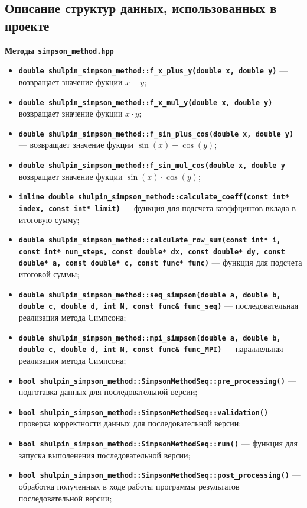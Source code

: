 \documentclass[12pt,a4paper]{article}
\begin{document}
\subsection{Описание структур данных, использованных в проекте}
\textbf{Методы \texttt{simpson\_method.hpp}}
\begin{itemize}
    \item \textbf{\texttt{double shulpin\_simpson\_method::f\_x\_plus\_y(double x, double y)}} --- возвращает значение фукции $x + y$;
    \item \textbf{\texttt{double shulpin\_simpson\_method::f\_x\_mul\_y(double x, double y)}} --- возвращает значение фукции $x \cdot y$;
    \item \textbf{\texttt{double shulpin\_simpson\_method::f\_sin\_plus\_cos(double x, double y)}} --- возвращает значение фукции $\sin(x) + \cos(y)$;
    \item \textbf{\texttt{double shulpin\_simpson\_method::f\_sin\_mul\_cos(double x, double y}} --- возвращает значение фукции $\sin(x) \cdot \cos(y)$;
    \item \textbf{\texttt{inline double shulpin\_simpson\_method::calculate\_coeff(const int* index, const int* limit)}} --- функция для подсчета коэффцинтов вклада в итоговую сумму;
    \item \textbf{\texttt{double shulpin\_simpson\_method::calculate\_row\_sum(const int* i, const int* num\_steps, const double* dx, const double* dy, const double* a, const double* c, const func* func)}} --- функция для подсчета итоговой суммы;
    \item \textbf{\texttt{double shulpin\_simpson\_method::seq\_simpson(double a, double b, double c, double d, int N, const func\& func\_seq)}} --- последовательная реализация метода Симпсона;
    \item \textbf{\texttt{double shulpin\_simpson\_method::mpi\_simpson(double a, double b, double c, double d, int N, const func\& func\_MPI)}} --- параллельная реализация метода Симпсона;
    \item \textbf{\texttt{bool shulpin\_simpson\_method::SimpsonMethodSeq::pre\_processing()}} --- подготавка данных для последовательной версии;
    \item \textbf{\texttt{bool shulpin\_simpson\_method::SimpsonMethodSeq::validation()}} --- проверка корректности данных для последовательной версии;
    \item \textbf{\texttt{bool shulpin\_simpson\_method::SimpsonMethodSeq::run()}} --- функция для запуска выполенения последовательной версии;
    \item \textbf{\texttt{bool shulpin\_simpson\_method::SimpsonMethodSeq::post\_processing()}} --- обработка полученных в ходе работы программы результатов последовательной версии;

\end{itemize}
\end{document}
